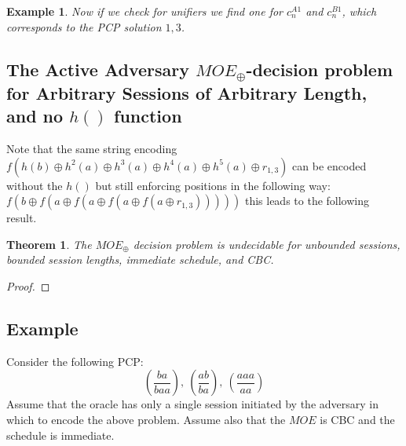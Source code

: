 \documentclass{easychair}
\newtheorem{example}{Example}
\newtheorem{theorem}{Theorem}
\begin{document}
{\begin{example}
		Now if we check for unifiers we find one for $c^{A1}_n$ and 
		$c^{B1}_n$, which corresponds to the PCP solution $1,3$.
		
\end{example}
\subsection{The Active Adversary $MOE_{\oplus}$-decision problem for Arbitrary Sessions of Arbitrary Length, and no $h()$ function}

Note that the same string encoding $f(h(b) \oplus h^2(a) 
\oplus h^3(a) \oplus h^4(a) \oplus h^5(a)
\oplus r_{1,3})$ can be encoded without the $h()$ but still enforcing
positions in the following way: 
$f(b \oplus f(a \oplus f(a \oplus f(a \oplus f(a \oplus r_{1,3})))))$ 
this leads to the following result.

\begin{theorem}\label{thm:bounded_unbounded}
	The $MOE_{\oplus}$ decision problem is undecidable for unbounded 
	sessions, bounded session lengths, immediate schedule, and CBC.	
\end{theorem}
\begin{proof}
\end{proof}
\vfill
\pagebreak
\subsection{Example}
Consider the following PCP:
\[
(\frac{ba}{baa}),~(\frac{ab}{ba}),~(\frac{aaa}{aa})
\] 
Assume that the oracle has only a single session initiated by the 
adversary in which to encode the above problem. Assume also that the
$MOE$ is CBC and the schedule is immediate.  

}
\end{document}

